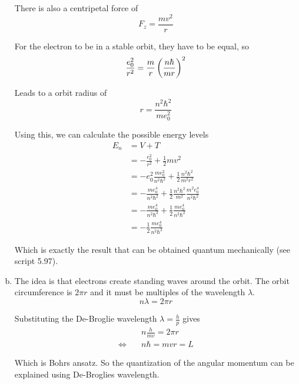 \documentclass[a4paper,german,12pt,smallheadings]{scrartcl}
\begin{document}
\begin{enumerate}[a)]
    There is also a centripetal force of
    \begin{equation*}
      F_{z} = \frac{mv^2}{r}
    \end{equation*}

    For the electron to be in a stable orbit, they have to be equal, so
    \begin{equation*}
      \frac{e_0^2}{r^2} = \frac{m}{r} \del{\frac{n \hbar}{m r}}^2
    \end{equation*}

    Leads to a orbit radius of
    \begin{equation*}
      r = \frac{n^2\hbar^2}{me_0^2}
    \end{equation*}

    Using this, we can calculate the possible energy levels
    \begin{align*}
      E_n &= V + T \\
          &= -\frac{e_0^2}{r^2} + \frac{1}{2} m v^2 \\
          &= -e_0^2 \frac{me_0^2}{n^2 \hbar^2} + \frac{1}{2} \frac{n^2 \hbar^2}{m^2 r^2} \\
          &= -\frac{me_0^4}{n^2 \hbar^2} + \frac{1}{2} \frac{n^2 \hbar^2}{m^2} \frac{m^2e_0^4}{n^2 \hbar^2} \\
          &= -\frac{me_0^4}{n^2 \hbar^2} + \frac{1}{2} \frac{me_0^4}{n^2 \hbar^2} \\
          &= -\frac{1}{2} \frac{me_0^4}{n^2 \hbar^2}
    \end{align*}

    Which is exactly the result that can be obtained quantum mechanically (see
    script 5.97).

  \item
    The idea is that electrons create standing waves around the orbit. The
    orbit circumference is $2 \pi r$ and it must be multiples of the wavelength
    $\lambda$.
    \begin{equation*}
      n \lambda = 2 \pi r
    \end{equation*}

    Substituting the De-Broglie wavelength $\lambda = \frac{h}{p}$ gives
    \begin{align*}
                           &n \frac{h}{mv} = 2 \pi r \\
      \Leftrightarrow\quad &n \hbar = mvr = L
    \end{align*}

    Which is Bohrs ansatz. So the quantization of the angular momentum can be
    explained using De-Broglies wavelength.

\end{enumerate}
\end{document}
